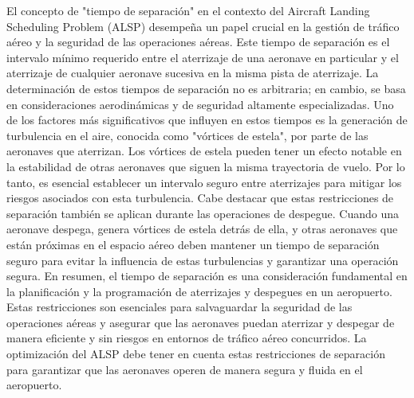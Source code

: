 \documentclass[letter, 10pt]{article}
\begin{document}
El concepto de "tiempo de separaci\'on" en el contexto del Aircraft Landing Scheduling Problem (ALSP) desempe\~{n}a un papel crucial en la gesti\'on de tr\'afico a\'ereo y la seguridad de las operaciones a\'ereas. Este tiempo de separaci\'on es el intervalo m\'inimo requerido entre el aterrizaje de una aeronave en particular y el aterrizaje de cualquier aeronave sucesiva en la misma pista de aterrizaje. La determinaci\'on de estos tiempos de separaci\'on no es arbitraria; en cambio, se basa en consideraciones aerodin\'amicas y de seguridad altamente especializadas. Uno de los factores m\'as significativos que influyen en estos tiempos es la generaci\'on de turbulencia en el aire, conocida como "v\'ortices de estela", por parte de las aeronaves que aterrizan. Los v\'ortices de estela pueden tener un efecto notable en la estabilidad de otras aeronaves que siguen la misma trayectoria de vuelo. Por lo tanto, es esencial establecer un intervalo seguro entre aterrizajes para mitigar los riesgos asociados con esta turbulencia. Cabe destacar que estas restricciones de separaci\'on tambi\'en se aplican durante las operaciones de despegue. Cuando una aeronave despega, genera v\'ortices de estela detr\'as de ella, y otras aeronaves que est\'an pr\'oximas en el espacio a\'ereo deben mantener un tiempo de separaci\'on seguro para evitar la influencia de estas turbulencias y garantizar una operaci\'on segura. En resumen, el tiempo de separaci\'on es una consideraci\'on fundamental en la planificaci\'on y la programaci\'on de aterrizajes y despegues en un aeropuerto. Estas restricciones son esenciales para salvaguardar la seguridad de las operaciones a\'ereas y asegurar que las aeronaves puedan aterrizar y despegar de manera eficiente y sin riesgos en entornos de tr\'afico a\'ereo concurridos. La optimizaci\'on del ALSP debe tener en cuenta estas restricciones de separaci\'on para garantizar que las aeronaves operen de manera segura y fluida en el aeropuerto. \\
 
\end{document}
